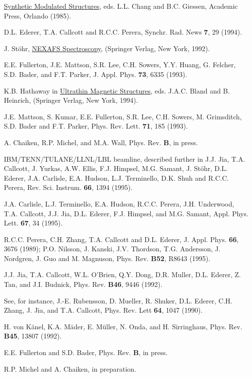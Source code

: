 \begin{references}

 \underline{Synthetic Modulated Structures},
eds. L.L. Chang and B.C. Giessen, Academic Press, Orlando (1985).

 D.L. Ederer, T.A. Callcott and R.C.C. Perera,
Synchr. Rad. News {\bf 7}, 29 (1994).

J. St\"ohr, \underline{NEXAFS Spectroscopy}, (Springer Verlag, New
York, 1992).

 E.E. Fullerton, J.E. Mattson, S.R. Lee,
C.H. Sowers, Y.Y. Huang, G. Felcher, S.D. Bader, and F.T. Parker,
J. Appl. Phys. {\bf 73}, 6335 (1993).

 K.B. Hathaway in \underline{Ultrathin Magnetic
Structures}, eds. J.A.C. Bland and B. Heinrich, (Springer Verlag, New
York, 1994).

 J.E. Mattson, S. Kumar, E.E. Fullerton, S.R. Lee,
C.H. Sowers, M. Grimsditch, S.D. Bader and F.T. Parker,
Phys. Rev. Lett. {\bf 71}, 185 (1993).

 A. Chaiken, R.P. Michel, and M.A. Wall,
Phys. Rev. {\bf B}, in press.

 IBM/TENN/TULANE/LLNL/LBL beamline, described
further in J.J. Jia, T.A. Callcott, J. Yurkas, A.W. Ellis,
F.J. Himpsel, M.G. Samant, J. St\"ohr, D.L. Ederer, J.A. Carlisle,
E.A. Hudson, L.J. Terminello, D.K. Shuh and R.C.C. Perera,
Rev. Sci. Instrum. {\bf 66}, 1394 (1995).

 J.A. Carlisle, L.J. Terminello, E.A. Hudson,
R.C.C. Perera, J.H. Underwood, T.A. Callcott, J.J. Jia, D.L. Ederer,
F.J. Himpsel, and M.G. Samant, Appl. Phys. Lett. {\bf 67}, 34 (1995).

  R.C.C. Perera, C.H. Zhang, T.A. Callcott and D.L.
Ederer, J. Appl. Phys. {\bf 66}, 3676 (1989); P.O. Nilsson, J. Kanski,
J.V. Thordson, T.G.  Andersson, J. Nordgren, J. Guo and M. Magnuson,
Phys. Rev. {\bf B52}, R8643 (1995).

 J.J. Jia, T.A. Callcott, W.L. O'Brien, Q.Y. Dong,
D.R. Muller, D.L. Ederer, Z. Tan, and J.I. Budnick, Phys. Rev. {\bf
B46}, 9446 (1992).

 See, for instance, J.-E. Rubensson, D. Mueller,
R.  Shuker, D.L. Ederer, C.H. Zhang, J. Jia, and T.A.
Callcott, Phys. Rev. Lett {\bf 64}, 1047 (1990).


 H. von K\"anel, K.A. M\"ader, E. M\"uller, N. Onda,
and H. Sirringhaus,  Phys. Rev. {\bf B45}, 13807 (1992).

 E.E. Fullerton and S.D. Bader, Phys. Rev. {\bf
B}, in press.

 R.P. Michel and A. Chaiken, in preparation.

\end{references}

